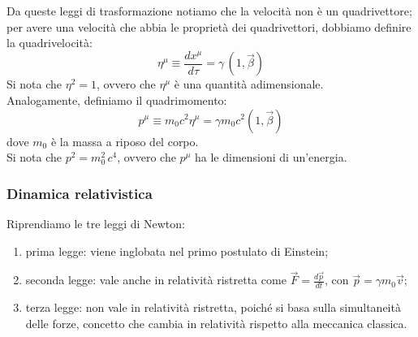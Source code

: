 \documentclass[]{article}
\begin{document}
Da queste leggi di trasformazione notiamo che la velocità non è un quadrivettore; per avere una velocità che abbia le proprietà dei quadrivettori, dobbiamo definire la quadrivelocità:
\begin{equation}
	\eta^{\mu} \equiv \displaystyle\frac{dx^{\mu}}{d\tau} = \gamma \, (1, \vec{\beta})
	\label{eq:16}
\end{equation}
Si nota che $ \eta^2 = 1 $, ovvero che $ \eta^{\mu} $ è una quantità adimensionale. \\ 
%
Analogamente, definiamo il quadrimomento:
\begin{equation}
	p^{\mu} \equiv m_0 c^2 \eta^{\mu} = \gamma m_0 c^2 (1, \vec{\beta})
	\label{eq:17}
\end{equation}
dove $ m_0 $ è la massa a riposo del corpo. \\ 
Si nota che $ p^2 = m_0^2 \, c^4 $, ovvero che $ p^{\mu} $ ha le dimensioni di un'energia.

\subsubsection{Dinamica relativistica}

Riprendiamo le tre leggi di Newton:
\begin{enumerate}
	\item prima legge: viene inglobata nel primo postulato di Einstein;
	\item seconda legge: vale anche in relatività ristretta come $ \vec{F} = \frac{d\vec{p}}{dt} $, con $ \vec{p} = \gamma m_0 \vec{v} $;
	\item terza legge: non vale in relatività ristretta, poiché si basa sulla simultaneità delle forze, concetto che cambia in relatività rispetto alla meccanica classica.
\end{enumerate}
\end{document}
